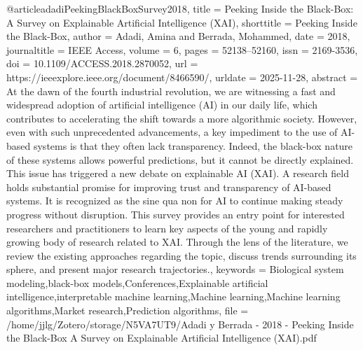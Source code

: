@article{adadiPeekingBlackBoxSurvey2018,
  title = {Peeking {{Inside}} the {{Black-Box}}: {{A Survey}} on {{Explainable Artificial Intelligence}} ({{XAI}})},
  shorttitle = {Peeking {{Inside}} the {{Black-Box}}},
  author = {Adadi, Amina and Berrada, Mohammed},
  date = {2018},
  journaltitle = {IEEE Access},
  volume = {6},
  pages = {52138--52160},
  issn = {2169-3536},
  doi = {10.1109/ACCESS.2018.2870052},
  url = {https://ieeexplore.ieee.org/document/8466590/},
  urldate = {2025-11-28},
  abstract = {At the dawn of the fourth industrial revolution, we are witnessing a fast and widespread adoption of artificial intelligence (AI) in our daily life, which contributes to accelerating the shift towards a more algorithmic society. However, even with such unprecedented advancements, a key impediment to the use of AI-based systems is that they often lack transparency. Indeed, the black-box nature of these systems allows powerful predictions, but it cannot be directly explained. This issue has triggered a new debate on explainable AI (XAI). A research field holds substantial promise for improving trust and transparency of AI-based systems. It is recognized as the sine qua non for AI to continue making steady progress without disruption. This survey provides an entry point for interested researchers and practitioners to learn key aspects of the young and rapidly growing body of research related to XAI. Through the lens of the literature, we review the existing approaches regarding the topic, discuss trends surrounding its sphere, and present major research trajectories.},
  keywords = {Biological system modeling,black-box models,Conferences,Explainable artificial intelligence,interpretable machine learning,Machine learning,Machine learning algorithms,Market research,Prediction algorithms},
  file = {/home/jjlg/Zotero/storage/N5VA7UT9/Adadi y Berrada - 2018 - Peeking Inside the Black-Box A Survey on Explainable Artificial Intelligence (XAI).pdf}
}

